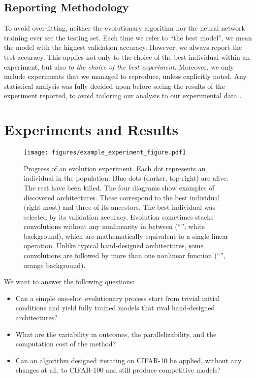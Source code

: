 \documentclass{article}
\renewcommand{\cite}[1]{\citep{#1}}
\begin{document}
\subsection{Reporting Methodology}
\label{reporting_section}

To avoid over-fitting, neither the evolutionary algorithm nor the neural network training ever see the testing set. Each time we refer to ``the best model'', we mean the model with the highest validation accuracy. However, we always report the test accuracy. This applies not only to the choice of the best individual within an experiment, but also {\em to the choice of the best experiment}. Moreover, we only include experiments that we managed to reproduce, unless explicitly noted. Any statistical analysis was fully decided upon before seeing the results of the experiment reported, to avoid tailoring our analysis to our experimental data \cite{simmons2011false}.


\section{Experiments and Results}
\label{results_section}

\begin{figure*}
    \vskip 0.2in
    \begin{centering}
        \centerline{\texttt{[image: figures/example\_experiment\_figure.pdf]}}
        \caption{Progress of an evolution experiment. Each dot represents an individual in the population. Blue dots (darker, top-right) are alive. The rest have been killed. The four diagrams show examples of discovered architectures. These correspond to the best individual (right-most) and three of its ancestors. The best individual was selected by its validation accuracy. Evolution sometimes stacks convolutions without any nonlinearity in between (``'', white background), which are mathematically equivalent to a single linear operation. Unlike typical hand-designed architectures, some convolutions are followed by more than one nonlinear function (``'', orange background).}
        \label{example_experiment_figure}
    \end{centering}
    \vskip 0.2in
\end{figure*}

We want to answer the following questions:
\begin{itemize}[noitemsep,topsep=0pt,leftmargin=*]
    \item Can a simple one-shot evolutionary process start from trivial initial conditions and yield fully trained models that rival hand-designed architectures?
    \item What are the variability in outcomes, the parallelizability, and the computation cost of the method?
    \item Can an algorithm designed iterating on CIFAR-10 be applied, without any changes at all, to CIFAR-100 and still produce competitive models?
\end{itemize}
\end{document}
